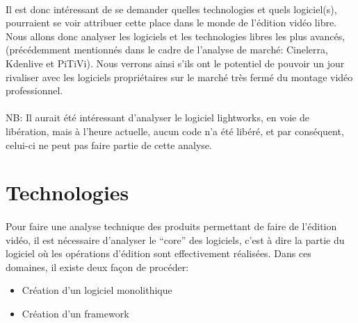 \paragraph{}

Il est donc intéressant de se demander quelles technologies et quels
logiciel(s), pourraient se voir attribuer cette place dans le monde
de l'édition vidéo libre. Nous allons donc analyser les logiciels
et les technologies libres les plus avancés, (précédemment mentionnés
dans le cadre de l'analyse de marché: Cinelerra, Kdenlive et PiTiVi).
Nous verrons ainsi s'ils ont le potentiel de pouvoir un
jour rivaliser avec les logiciels propriétaires sur le marché très
fermé du montage vidéo professionnel.

\paragraph{}

NB: Il aurait été intéressant d'analyser le logiciel lightworks,
en voie de libération, mais à l'heure actuelle, aucun code n'a été
libéré, et par conséquent, celui-ci ne peut pas faire partie de cette
analyse.

\newpage

\section{Technologies}

\paragraph{}

Pour faire une analyse technique des produits permettant de faire
de l'édition vidéo, il est nécessaire d'analyser le ``core'' des
logiciels, c'est à dire la partie du logiciel où les opérations
d'édition sont effectivement réalisées. Dans ces domaines, il existe
deux façon de procéder:

\begin{itemize} \setlength{\itemsep}{2mm}

  \item{Création d'un logiciel monolithique}

  \item{Création d'un framework  }

\end{itemize}

